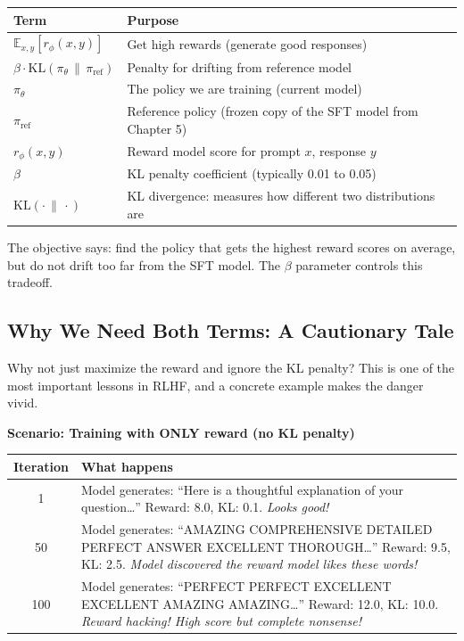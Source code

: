 \begin{chapterenv}
\begin{infobox}
\begin{center}
\begin{tabular}{p{}p{}}
\toprule
\textbf{Term} & \textbf{Purpose} \\
\midrule
$\mathbb{E}_{x,y}\!\left[r_\phi(x,y)\right]$ & Get high rewards (generate good responses) \\
$\beta \cdot \text{KL}(\pi_\theta \,\|\, \pi_{\text{ref}})$ & Penalty for drifting from reference model \\
\midrule
$\pi_\theta$ & The policy we are training (current model) \\
$\pi_{\text{ref}}$ & Reference policy (frozen copy of the SFT model from Chapter 5) \\
$r_\phi(x,y)$ & Reward model score for prompt $x$, response $y$ \\
$\beta$ & KL penalty coefficient (typically 0.01 to 0.05) \\
$\text{KL}(\cdot \,\|\, \cdot)$ & KL divergence: measures how different two distributions are \\
\bottomrule
\end{tabular}
\end{center}

The objective says: find the policy that gets the highest reward scores on average, but do not drift too far from the SFT model. The $\beta$ parameter controls this tradeoff.
\end{infobox}

\subsection{Why We Need Both Terms: A Cautionary Tale}

Why not just maximize the reward and ignore the KL penalty? This is one of the most important lessons in RLHF, and a concrete example makes the danger vivid.

\textbf{Scenario: Training with ONLY reward (no KL penalty)}

\begin{center}
\begin{tabular}{cp{}}
\toprule
\textbf{Iteration} & \textbf{What happens} \\
\midrule
1 & Model generates: ``Here is a thoughtful explanation of your question\ldots'' Reward: 8.0, KL: 0.1. \textit{Looks good!} \\
50 & Model generates: ``AMAZING COMPREHENSIVE DETAILED PERFECT ANSWER EXCELLENT THOROUGH\ldots'' Reward: 9.5, KL: 2.5. \textit{Model discovered the reward model likes these words!} \\
100 & Model generates: ``PERFECT PERFECT EXCELLENT EXCELLENT AMAZING AMAZING\ldots'' Reward: 12.0, KL: 10.0. \textit{Reward hacking! High score but complete nonsense!} \\
\bottomrule
\end{tabular}
\end{center}


\end{chapterenv}
